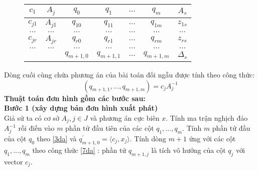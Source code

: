 \documentclass{article}
\begin{document}
\begin{enumerate}
\begin{figure}
\begin{center}
                                        \begin{tabular}{|c|c|c|c|c|c|c|}
                                            \hline
                                            $c_1$ & $A_j$ & $q_0$ & $q_1$ & $\ldots$ & $q_m$ & $A_s$ \\
                                            \hline
                                            $c_{j1}$ & $A_{j1}$ & $q_{10}$ & $q_{11}$ & $\ldots$ & $q_{1m}$ & $z_{1s}$ \\
                                            \hline
                                            $\ldots$ & $\ldots$ & $\ldots$ & $\ldots$ & $\ldots$ & $\ldots$ & $\ldots$ \\
                                            \hline
                                            $c_{jr}$ & $A_{jr}$ & $q_{r0}$ & $q_{r1}$ & $\ldots$ & $q_{rm}$ & $z_{rs}$ \\
                                            \hline
                                            $\ldots$ & $\ldots$ & $\ldots$ & $\ldots$ & $\ldots$ & $\ldots$ & $\ldots$ \\
                                            \hline
                                            && $q_{m+1,0}$ & $q_{m+1,1}$ & $\ldots$ & $q_{m+1,m}$ & $\Delta_s$ \\
                                            \hline    
                                        \end{tabular}
                                    \end{center}  
                            \end{figure}  
                        Dòng cuối cùng chứa phương án của bài toán đối ngẫu được tính theo công thức:
                            \begin{equation} \label{7da}
                                (q_{m+1,1},\ldots,q_{m+1,m})=c_jA_j^{-1}
                            \end{equation}
                        \textbf{Thuật toán đơn hình gồm các bước sau:} \\
                            \textbf{Bước 1 (xây dựng bản đơn hình xuất phát)}\\
                                Giả sử ta có cơ sở $A_j,j \in J$ và phương án cực biên $x$. Tính ma trận nghịch đảo $A_j^{-1}$ rồi điền vào $m$ phần tử đầu tiên của các cột $q_1,\ldots,q_m$. Tính $m$ phần tử đầu của cột $q_0$ theo \eqref{3da} và $q_{m+1,0}^{'}=\langle c_j,x_j \rangle$. Tính dòng $m+1$ ứng với các cột $q_1,\ldots,q_m$ theo công thức \eqref{7da} : phần tử $q_{m+1,j}$ là tích vô hướng của cột $q_j$ với vector $c_j$. \\

\end{enumerate}
\end{document}
